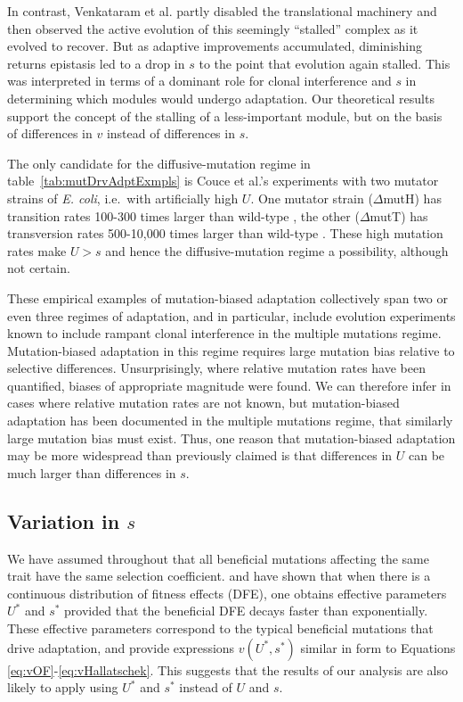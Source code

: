 \documentclass[9pt,twocolumn,twoside]{article}
\begin{document}
In contrast, Venkataram et al. \citep{venkataram2019evolutionary} partly disabled the translational machinery and then observed the active evolution of this seemingly ``stalled'' complex as it evolved to recover. But as adaptive improvements accumulated, diminishing returns epistasis led to a drop in $s$ to the point that evolution again stalled. This was interpreted in terms of a dominant role for clonal interference and $s$ in determining which modules would undergo adaptation. Our theoretical results support the concept of the stalling of a less-important module, but on the basis of differences in $v$ instead of differences in $s$.

The only candidate for the diffusive-mutation regime in table~\ref{tab:mutDrvAdptExmpls} is Couce et al.'s \citep{Couce2015} experiments with two mutator strains of \textit{E. coli}, i.e.~with artificially high $U$. One mutator strain ($\Delta$mutH) has transition rates 100-300 times larger than wild-type \citep{Cupples1989,Seier2011}, the other ($\Delta$mutT) has transversion rates 500-10,000 times larger than wild-type \citep{Cupples1989,Vidmar2020}. These high mutation rates make $U>s$ and hence the diffusive-mutation regime a possibility, although not certain.

These empirical examples of mutation-biased adaptation collectively span two or even three regimes of adaptation, and in particular, include evolution experiments known to include rampant clonal interference in the multiple mutations regime. Mutation-biased adaptation in this regime requires large mutation bias relative to selective differences. Unsurprisingly, where relative mutation rates have been quantified, biases of appropriate magnitude were found. We can therefore infer in cases where relative mutation rates are not known, but mutation-biased adaptation has been documented in the multiple mutations regime, that similarly large mutation bias must exist. Thus, one reason that mutation-biased adaptation may be more widespread than previously claimed \citep{svensson2019role} is that differences in $U$ can be much larger than differences in $s$. 

\subsection{Variation in $s$}

We have assumed throughout that all beneficial mutations affecting the same trait have the same selection coefficient. \citet{good2012distribution} and \citet{good2014deleterious} have shown that when there is a continuous distribution of fitness effects (DFE), one obtains effective parameters $U^*$ and $s^*$ provided that the beneficial DFE decays faster than exponentially. These effective parameters correspond to the typical beneficial mutations that drive adaptation, and provide expressions $v(U^*,s^*)$ similar in form to Equations \eqref{eq:vOF}-\eqref{eq:vHallatschek}. This suggests that the results of our analysis are also likely to apply using $U^*$ and $s^*$ instead of $U$ and $s$.   
\end{document}

